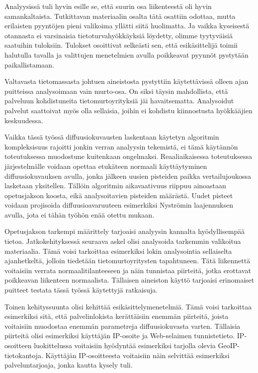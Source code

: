 Analyysissä tuli hyvin esille se, että suurin osa liikenteestä oli
hyvin samankaltaista. Tutkittavan materiaalin osalta tätä osattiin
odottaa, mutta erilaisten pyyntöjen pieni valikoima yllätti siitä
huolimatta. Ja vaikka kyseisestä otannasta ei varsinaisia
tietoturvahyökkäyksiä löydetty, olimme tyytyväisiä saatuihin
tuloksiin. Tulokset osoittivat selkeästi sen, että esikäsittelijä
toimii halutulla tavalla ja valittujen menetelmien avulla poikkeavat
pyynnöt pystytään paikallistamaan.

Valtavasta tietomassasta johtuen aineistosta pystyttiin käytettävissä
olleen ajan puitteissa analysoimaan vain murto-osa. On siksi täysin
mahdollista, että palveluun kohdistuneita tietomurtoyrityksiä jäi
havaitsematta. Analysoidut palvelut saattoivat myös olla sellaisia,
joihin ei kohdistu kiinnostusta hyökkääjien keskuudessa.

Vaikka tässä työssä diffuusiokuvausten laskentaan käytetyn algoritmin
kompleksisuus rajoitti jonkin verran analyysin tekemistä, ei tämä
käytännön toteutuksessa muodostune kuitenkaan
ongelmaksi. Reaaliaikaisessa toteutuksessa järjestelmälle voidaan
opettaa etukäteen normaali käyttäytyminen diffuusiokuvauksen avulla,
jonka jälkeen uusien pisteiden paikka vertailujoukossa lasketaan
yksitellen. Tällöin algoritmin aikavaativuus riippuu ainoastaan
opetusjakson koosta, eikä analysoitavien pisteiden määrästä. Uudet
pisteet voidaan projisoida diffuusioavaruuteen esimerkiksi Nyströmin
laajennuksen avulla, jota ei tähän työhön enää otettu
mukaan.

Opetusjakson tarkempi määrittely tarjoaisi analyysin kannalta
hyödyllisempää tietoa. Jatkokehityksessä seuraava askel olisi
analysoida tarkemmin valikoitua materiaalia. Tämä voisi tarkoittaa
esimerkiksi lokin analysointia sellaiselta ajanhetkeltä, jolloin tiedetään
tietomurtoyritysten tapahtuneen. Tätä liikennettä voitaisiin verrata
normaalitilanteeseen ja näin tunnistaa piirteitä, jotka erottavat
poikkeavan liikenteen normaalista.  Tällaisen aineiston käyttö
tarjoaisi erinomaiset puitteet testata tässä työssä käytettyjä
ratkaisuja.

Toinen kehityssuunta olisi kehittää esikäsittelymenetelmiä. Tämä voisi
tarkoittaa esimerkiksi sitä, että palvelinlokista kerättäisiin enemmän
piirteitä, joista voitaisiin muodostaa enemmän parametreja
diffuusiokuvasta varten. Tällaisia piirteitä olisi esimerkiksi
käyttäjän IP-osoite ja Web-selaimen tunnistetieto. IP-osoitteen
luokittelussa voitaisiin hyödyntää esimerkiksi tarjolla olevia
GeoIP-\-tietokantoja. Käyttäjän IP-osoitteesta voitaisiin näin
selvittää esimerkiksi palveluntarjoaja, jonka kautta kysely
tuli.

